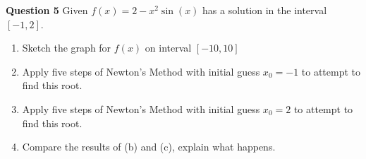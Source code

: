 



\begin{tcolorbox}
\textbf{Question 5} 
Given $f(x)=2-x^{2} \sin (x)$ has a solution in the interval $[-1,2]$.
\begin{enumerate}[label=(\alph*)]
	\item Sketch the graph for $f(x)$ on interval $[-10,10]$
	\item Apply five steps of Newton's Method with initial guess $x_{0}=-1$ to attempt to find this root.
	\item Apply five steps of Newton's Method with initial guess $x_{0}=2$ to attempt to find this root.
	\item Compare the results of (b) and (c), explain what happens.
\end{enumerate}

\end{tcolorbox}

